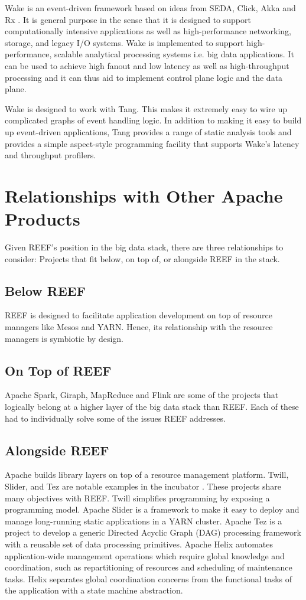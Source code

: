 \documentclass[9pt,twocolumn,twoside]{../../styles/osajnl}
\begin{document}
Wake is an event-driven framework based on ideas from SEDA, Click,
Akka and Rx \cite{reefwake}. It is general purpose in the sense that
it is designed to support computationally intensive applications as
well as high-performance networking, storage, and legacy I/O
systems. Wake is implemented to support high-performance, scalable
analytical processing systems i.e. big data applications. It can be
used to achieve high fanout and low latency as well as high-throughput
processing and it can thus aid to implement control plane logic and
the data plane.

Wake is designed to work with Tang. This makes it extremely easy to
wire up complicated graphs of event handling logic. In addition to
making it easy to build up event-driven applications, Tang provides a
range of static analysis tools and provides a simple aspect-style
programming facility that supports Wake’s latency and throughput
profilers.

\section{Relationships with Other Apache Products}

Given REEF's position in the big data stack, there are three
relationships to consider: Projects that fit below, on top of, or
alongside REEF in the stack.

\subsection{Below REEF}
REEF is designed to facilitate application development on top of
resource managers like Mesos and YARN. Hence, its relationship with
the resource managers is symbiotic by design.

\subsection{On Top of REEF}
Apache Spark, Giraph, MapReduce and Flink are some of the projects
that logically belong at a higher layer of the big data stack than
REEF. Each of these had to individually solve some of the issues REEF
addresses.

\subsection{Alongside REEF}

Apache builds library layers on top of a resource management
platform. Twill, Slider, and Tez are notable examples in the incubator
\cite{reefproposal}. These projects share many objectives with
REEF. Twill simplifies programming by exposing a programming
model. Apache Slider is a framework to make it easy to deploy and
manage long-running static applications in a YARN cluster. Apache Tez
is a project to develop a generic Directed Acyclic Graph (DAG)
processing framework with a reusable set of data processing
primitives. Apache Helix automates application-wide management
operations which require global knowledge and coordination, such as
repartitioning of resources and scheduling of maintenance tasks. Helix
separates global coordination concerns from the functional tasks of
the application with a state machine abstraction.
\end{document}
